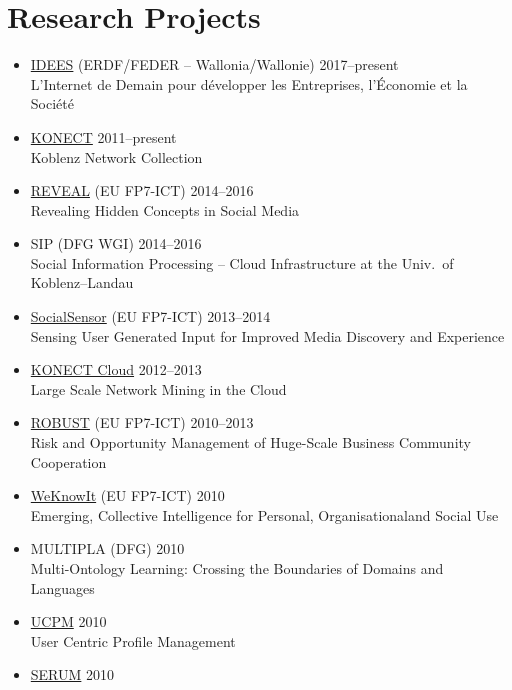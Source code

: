 \documentclass[line,mm]{res}
\newcounter{x}
\newcounter{y}
\begin{document}
\begin{resume}
\begin{itemize}
\end{itemize}

\section{Research Projects}
\begin{itemize}
\item 
  \href{http://nouvelles.unamur.be/upnews.2015-10-01.8995593781}{IDEES} (ERDF/FEDER -- Wallonia/Wallonie) \hfill 2017--present \\
  L'Internet de Demain pour développer les Entreprises, l'Économie et la Société 
\item \href{http://konect.cc/}{KONECT} \hfill 2011--present \\
  Koblenz Network Collection
\item \href{http://revealproject.eu/}{REVEAL} (EU FP7-ICT) \hfill 2014--2016 \\
  Revealing Hidden Concepts in Social Media
\item SIP (DFG WGI) \hfill 2014--2016 \\
  Social Information Processing -- Cloud Infrastructure at the Univ.\ of Koblenz--Landau
\item \href{http://www.socialsensor.eu/}{SocialSensor} (EU FP7-ICT) \hfill 2013--2014 \\
  Sensing User Generated Input for Improved Media Discovery and Experience
\item \href{https://books.google.be/books?id=06fDCQAAQBAJ&pg=PA107}{KONECT Cloud} \hfill 2012--2013 \\
  Large Scale Network Mining in the Cloud
\item \href{http://www.robust-project.eu/}{ROBUST} (EU FP7-ICT) \hfill 2010--2013 \\
  Risk and Opportunity Management of Huge-Scale Business Community Cooperation 
\item \href{http://www.weknowit.eu/}{WeKnowIt} (EU FP7-ICT) \hfill 2010 \\
   Emerging, Collective Intelligence for Personal, Organisationaland Social Use
\item MULTIPLA (DFG) \hfill 2010 \\
  Multi-Ontology Learning:  Crossing the Boundaries of Domains and Languages
\item \href{http://www.dai-labor.de/en/irml/ucpm/}{UCPM} \hfill 2010 \\
  User Centric Profile Management
\item \href{http://www.dai-labor.de/en/irml/serum/}{SERUM} \hfill 2010 \\

\end{itemize}
\end{resume}
\end{document}
